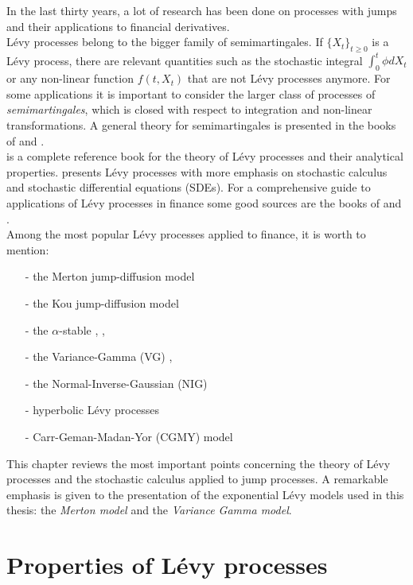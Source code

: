 In the last thirty years, a lot of research has been done on processes with jumps and their applications to financial derivatives.\\
Lévy processes belong to the bigger family of semimartingales.
If $\{X_t\}_{t \ge 0}$ is a Lévy process, there are relevant quantities such as the stochastic integral $\int_0^t \phi dX_t$ or any non-linear function
$f(t,X_t)$ that are not Lévy processes anymore. For some applications it is important to consider the larger class of processes of \emph{semimartingales}, which is closed
with respect to integration and non-linear transformations.
A general theory for semimartingales is presented in the books 
of \cite{Protter} and \cite{JacodShi}.\\
\cite{Sato} is a complete reference book for the theory of Lévy
processes and their analytical properties. 
\cite{Applebaum} presents Lévy processes with more emphasis on stochastic calculus and stochastic differential equations (SDEs).
For a comprehensive guide to applications of Lévy processes in finance some good sources are the books of 
\cite{Cont} and \cite{Schoutens}.\\ 
Among the most popular Lévy processes applied to finance, it is worth to mention:
\begin{itemize}
 \item[-] the Merton jump-diffusion model \cite{Me76}
 \item[-] the Kou jump-diffusion model \cite{Kou02}
 \item[-] the $\alpha$-stable \cite{Ma63}, \cite{BoPoCo97}, \cite{alpha09}
 \item[-] the Variance-Gamma (VG) \cite{MaSe90}, \cite{MCC98}
 \item[-] the Normal-Inverse-Gaussian (NIG) \cite{BN97}
 \item[-] hyperbolic Lévy processes \cite{EbKe95}
 \item[-] Carr-Geman-Madan-Yor (CGMY) model \cite{CGMY02}
\end{itemize}
This chapter reviews the most important points concerning the theory of Lévy processes and the stochastic calculus applied to jump processes.
A remarkable emphasis is given to the presentation of the exponential Lévy models used in this thesis: 
the \emph{Merton model} and the \emph{Variance Gamma model}.

\section{Properties of Lévy processes}

